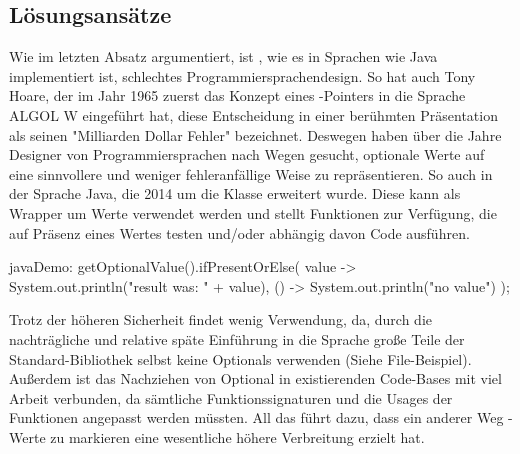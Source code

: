 \subsection{Lösungsansätze}
Wie im letzten Absatz argumentiert, ist , wie es in Sprachen wie Java implementiert ist, schlechtes
Programmiersprachendesign.
So hat auch Tony Hoare, der im Jahr 1965 zuerst das Konzept eines -Pointers in die Sprache ALGOL W
eingeführt hat, diese Entscheidung in einer berühmten Präsentation als seinen "Milliarden Dollar Fehler" bezeichnet.\cite{infoqNullRefs}
Deswegen haben über die Jahre Designer von Programmiersprachen nach Wegen gesucht, optionale Werte auf eine sinnvollere
und weniger fehleranfällige Weise zu repräsentieren.
So auch in der Sprache Java, die 2014 um die  Klasse erweitert wurde.\cite{jdocOptional}
Diese kann als Wrapper um Werte verwendet werden und stellt Funktionen zur Verfügung, die auf Präsenz eines Wertes
testen und/oder abhängig davon Code ausführen.

\begin{codeBlock}{java}{Demo: }
getOptionalValue().ifPresentOrElse(
    value -> System.out.println("result was: " + value),
    () -> System.out.println("no value")
);
\end{codeBlock}

Trotz der höheren Sicherheit findet  wenig Verwendung, da, durch die nachträgliche und relative
späte Einführung in die Sprache große Teile der Standard-Bibliothek selbst keine Optionals verwenden (Siehe
File-Beispiel).
Außerdem ist das Nachziehen von Optional in existierenden Code-Bases mit viel Arbeit verbunden, da sämtliche
Funktionssignaturen und die Usages der Funktionen angepasst werden müssten.
All das führt dazu, dass ein anderer Weg -Werte zu markieren eine wesentliche höhere Verbreitung
erzielt hat.

